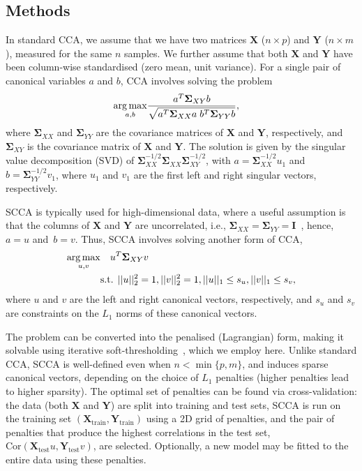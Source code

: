 \documentclass{bioinfo}
\DeclareMathOperator*{\argmax}{arg\,max}
\newcommand{\s}{\mathbf{\Sigma}}
\begin{document}
\vspace*{-12pt}
\begin{methods}
\section{Methods}

In standard CCA, we assume that we have two matrices $\mathbf{X}$ ($n \times p$)
and $\mathbf{Y}$ ($n \times m$), measured for the same $n$ samples.
We further assume that both $\mathbf{X}$ and $\mathbf{Y}$ have been
column-wise standardised (zero mean, unit variance).  For a single pair of 
canonical variables $a$ and $b$, CCA involves solving the problem
\vspace*{-10pt}
\begin{align}
\argmax_{a,b} & \frac{a^T \s_{XY} b}{\sqrt{a^T \s_{XX} a \; b^T \s_{YY} b}},
\label{eqn:cca}
\vspace*{-10pt}
\end{align}
where $\s_{XX}$ and $\s_{YY}$ are the covariance matrices of
$\mathbf{X}$ and $\mathbf{Y}$, respectively, and $\s_{XY}$ is the
covariance matrix of $\mathbf{X}$ and $\mathbf{Y}$. The solution is given by
the singular value decomposition (SVD) of $\s_{XX}^{-1/2} \s_{XX}
\s_{XY}^{-1/2}$, with $a = \s_{XX}^{-1/2} u_1$ and $b =
\s_{YY}^{-1/2} v_1$, where $u_1$ and $v_1$ are the first left and right
singular vectors, respectively.

SCCA is typically used for high-dimensional data, where a useful assumption is that
the columns of $\mathbf{X}$ and $\mathbf{Y}$ are uncorrelated,
i.e., $\s_{XX}=\s_{YY}=\mathbf{I}$~\citep{Parkhomenko2009},
hence, $a = u$ and~$b = v$. Thus, SCCA involves solving another form of CCA,
\vspace*{-6pt}
\begin{align}
\argmax_{u,v} &  \quad u^T \s_{XY} v \notag \\
 & \mbox{s.t. } ||u||_2^2=1, ||v||_2^2 = 1, ||u||_1 \le s_u, ||v||_1 \le s_v,
\label{eqn:scca}\vspace*{-10pt}
\end{align}
where $u$ and $v$ are the left and right canonical vectors, respectively, and
$s_u$ and $s_v$ are constraints on the $L_1$ norms of these canonical vectors.

The problem can be converted into the penalised (Lagrangian) form, making it
solvable using iterative soft-thresholding~\citep{Parkhomenko2009}, which we
employ here.  Unlike standard CCA, SCCA is well-defined even when $n{<}\min
\{p, m\}$, and induces sparse canonical vectors, depending on the choice of
$L_1$ penalties (higher penalties lead to higher sparsity). The optimal set
of penalties can be found via cross-validation: the data (both $\mathbf{X}$
and $\mathbf{Y}$) are split into training and test sets, SCCA is run on
the training set $(\mathbf{X}_{\mbox{train}}, \mathbf{Y}_{\mbox{train}})$
using a 2D grid of penalties, and the pair of penalties that produce the
highest correlations in the test set, $\mbox{Cor}(\mathbf{X}_{\mbox{test}}
u, \mathbf{Y}_{\mbox{test}} v)$, are selected.  Optionally, a new model may
be fitted to the entire data using these penalties.


\end{methods}
\end{document}
